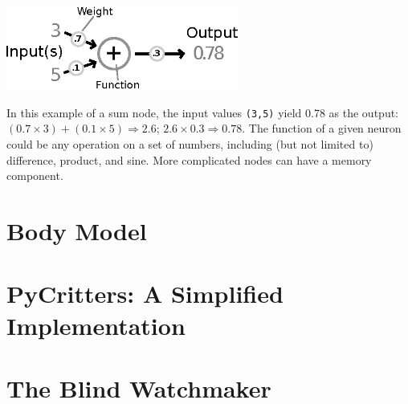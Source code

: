 \documentclass[10pt]{book}
\begin{document}
\beforefig
\centerline{\includegraphics[width=3in]{./figs/Neuron.eps}}
\afterfig

In this example of a sum node, the input values {\tt (3,5)} yield 0.78 as the output: 
$(0.7\times 3)+(0.1\times 5) \Rightarrow 2.6$; $2.6 \times 0.3 \Rightarrow 0.78$. 
The function of a given neuron could be any operation on a set of numbers, including 
(but not limited to) difference, product, and sine. More complicated nodes can 
have a memory component. %




\section{Body Model}



\section{PyCritters: A Simplified Implementation}


\section{The Blind Watchmaker}

\end{document}

